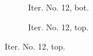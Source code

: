 \documentclass[a4paper,12pt]{amsart}
\numberwithin{equation}{section}
\begin{document}
\begin{figure}[h!]
\centering
\begin{subfigure}[t]{0.49\textwidth}
    \caption{Iter. No. 12, bot.}
\end{subfigure}
	\hfill
\begin{subfigure}[t]{0.49\textwidth}
    \caption{Iter. No. 12, top.}
\end{subfigure}


\end{figure}
\end{document}
